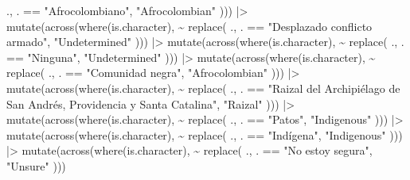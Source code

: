 \documentclass[
  bookmarksnumbered]{article}
\newenvironment{Shaded}{\begin{snugshade}}{\end{snugshade}}
\newcommand{\FunctionTok}[1]{\textcolor[rgb]{0.94,0.94,0.56}{#1}}
\newcommand{\NormalTok}[1]{\textcolor[rgb]{0.80,0.80,0.80}{#1}}
\newcommand{\SpecialCharTok}[1]{\textcolor[rgb]{0.86,0.64,0.64}{#1}}
\newcommand{\StringTok}[1]{\textcolor[rgb]{0.80,0.58,0.58}{#1}}
\begin{document}
\begin{Shaded}
\begin{Highlighting}[]
\NormalTok{    ., . }\SpecialCharTok{==}
      \StringTok{"Afrocolombiano"}\NormalTok{,}
    \StringTok{"Afrocolombian"}
\NormalTok{  ))) }\SpecialCharTok{|\textgreater{}}
  \FunctionTok{mutate}\NormalTok{(}\FunctionTok{across}\NormalTok{(}\FunctionTok{where}\NormalTok{(is.character), }\SpecialCharTok{\textasciitilde{}} \FunctionTok{replace}\NormalTok{(}
\NormalTok{    ., . }\SpecialCharTok{==}
      \StringTok{"Desplazado conflicto armado"}\NormalTok{,}
    \StringTok{"Undetermined"}
\NormalTok{  ))) }\SpecialCharTok{|\textgreater{}}
  \FunctionTok{mutate}\NormalTok{(}\FunctionTok{across}\NormalTok{(}\FunctionTok{where}\NormalTok{(is.character), }\SpecialCharTok{\textasciitilde{}} \FunctionTok{replace}\NormalTok{(}
\NormalTok{    ., . }\SpecialCharTok{==}
      \StringTok{"Ninguna"}\NormalTok{,}
    \StringTok{"Undetermined"}
\NormalTok{  ))) }\SpecialCharTok{|\textgreater{}}
  \FunctionTok{mutate}\NormalTok{(}\FunctionTok{across}\NormalTok{(}\FunctionTok{where}\NormalTok{(is.character), }\SpecialCharTok{\textasciitilde{}} \FunctionTok{replace}\NormalTok{(}
\NormalTok{    ., . }\SpecialCharTok{==}
      \StringTok{"Comunidad negra"}\NormalTok{,}
    \StringTok{"Afrocolombian"}
\NormalTok{  ))) }\SpecialCharTok{|\textgreater{}}
  \FunctionTok{mutate}\NormalTok{(}\FunctionTok{across}\NormalTok{(}\FunctionTok{where}\NormalTok{(is.character), }\SpecialCharTok{\textasciitilde{}} \FunctionTok{replace}\NormalTok{(}
\NormalTok{    ., . }\SpecialCharTok{==}
      \StringTok{"Raizal del Archipiélago de San Andrés, Providencia y Santa Catalina"}\NormalTok{,}
    \StringTok{"Raizal"}
\NormalTok{  ))) }\SpecialCharTok{|\textgreater{}}
  \FunctionTok{mutate}\NormalTok{(}\FunctionTok{across}\NormalTok{(}\FunctionTok{where}\NormalTok{(is.character), }\SpecialCharTok{\textasciitilde{}} \FunctionTok{replace}\NormalTok{(}
\NormalTok{    ., . }\SpecialCharTok{==}
      \StringTok{"Patos"}\NormalTok{,}
    \StringTok{"Indigenous"}
\NormalTok{  ))) }\SpecialCharTok{|\textgreater{}}
  \FunctionTok{mutate}\NormalTok{(}\FunctionTok{across}\NormalTok{(}\FunctionTok{where}\NormalTok{(is.character), }\SpecialCharTok{\textasciitilde{}} \FunctionTok{replace}\NormalTok{(}
\NormalTok{    ., . }\SpecialCharTok{==}
      \StringTok{"Indígena"}\NormalTok{,}
    \StringTok{"Indigenous"}
\NormalTok{  ))) }\SpecialCharTok{|\textgreater{}}
  \FunctionTok{mutate}\NormalTok{(}\FunctionTok{across}\NormalTok{(}\FunctionTok{where}\NormalTok{(is.character), }\SpecialCharTok{\textasciitilde{}} \FunctionTok{replace}\NormalTok{(}
\NormalTok{    ., . }\SpecialCharTok{==}
      \StringTok{"No estoy segura"}\NormalTok{,}
    \StringTok{"Unsure"}
\NormalTok{  )))}
\end{Highlighting}
\end{Shaded}
\end{document}
